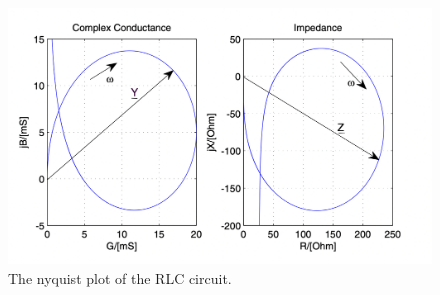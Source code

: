 \begin{figure}[H]
    \centering
    \includegraphics[scale=0.35]{images/nyquist_plot_rlc.png}
    \caption{The nyquist plot of the RLC circuit.}
\end{figure}
